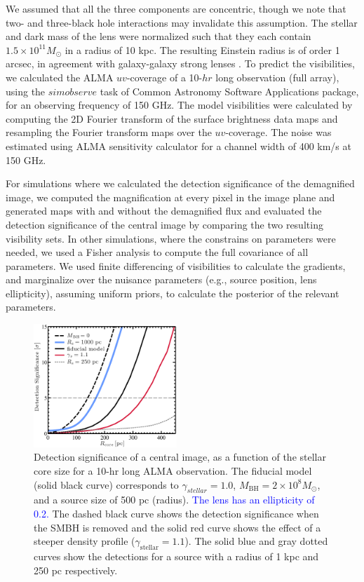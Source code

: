 \documentclass[chicago]{emulateapj}
\newcommand{\blue}{\textcolor{blue}}
\begin{document}
We assumed that all the three components are concentric, though we note that two- and three-black hole interactions may invalidate this assumption.
The stellar and dark mass of the lens were normalized such that they each contain $1.5\times10^{11} M_{\odot}$ in a radius of 10 kpc. The resulting Einstein radius is of order 1 arcsec, in agreement with galaxy-galaxy strong lenses \citep[e.g.,][]{hezaveh:13b}.
To predict the visibilities, we calculated the ALMA $uv$-coverage of a 10-$hr$ long observation (full array), using the $simobserve$ task of Common Astronomy Software Applications package, for an observing frequency of 150 GHz. 
The model visibilities were calculated by computing the 2D Fourier transform of the surface brightness data maps and resampling the Fourier transform maps over the $uv$-coverage. 
The noise was estimated using ALMA sensitivity calculator for a channel width of 400 km/s at 150 GHz. 


For simulations where we calculated the detection significance of the demagnified image, we computed the magnification at every pixel in the image plane and generated maps with and without the demagnified flux and evaluated the detection significance of the central image by comparing the two resulting visibility sets. In other simulations, where the constrains on parameters were needed, we used a Fisher analysis to compute the full covariance of all parameters. 
We used finite differencing of visibilities to calculate the gradients, and marginalize over the nuisance parameters (e.g., source position, lens ellipticity), assuming uniform priors, to calculate the posterior of the relevant parameters. 





\begin{figure}
\begin{center}
\centering
\includegraphics[trim= 0 0 0 0, clip,width=0.48\textwidth]{figures/f_03.eps}
\centering
\end{center}
\caption{ Detection significance of a central image, as a function of the stellar core size for a 10-hr long ALMA observation. 
The fiducial model (solid black curve) corresponds to $\gamma_{stellar}=1.0$, $M_{\mathrm{BH}}=2\times10^8 M_{\odot}$, and a source size of 500 pc (radius). \blue{The lens has an ellipticity of 0.2.} The dashed black curve shows the detection significance when the SMBH is removed and the solid red curve shows the effect of a steeper density profile ($\gamma_{\mathrm{stellar}}=1.1$). The solid blue and gray dotted curves show the detections for a source with a radius of 1 kpc and 250 pc respectively. 
\label{fig:3}}
\end{figure}
\end{document}
